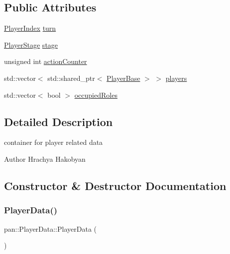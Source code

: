 \subsection*{Public Attributes}
\begin{DoxyCompactItemize}
\item 
\hyperlink{namespacepan_a0cdabf874fbf1bb3a1f0152d108c2909}{Player\+Index} \hyperlink{structpan_1_1_player_data_a5e25e3064088436cb55df4d1fe256cb0}{turn}
\item 
\hyperlink{namespacepan_a5c203ea0600f2bca14baf8f38e5bac5d}{Player\+Stage} \hyperlink{structpan_1_1_player_data_a8f06369e6df4f62a3d5be54cace7aa17}{stage}
\item 
unsigned int \hyperlink{structpan_1_1_player_data_a088b5b37693cc53f7be4c3f2860c6648}{action\+Counter}
\item 
std\+::vector$<$ std\+::shared\+\_\+ptr$<$ \hyperlink{classpan_1_1_player_base}{Player\+Base} $>$ $>$ \hyperlink{structpan_1_1_player_data_a44a9f5f24c1020e2c186205e08c184c5}{players}
\item 
std\+::vector$<$ bool $>$ \hyperlink{structpan_1_1_player_data_aa79e564016ca865b17e4bf1b241fc827}{occupied\+Roles}
\end{DoxyCompactItemize}


\subsection{Detailed Description}
container for player related data 

\begin{DoxyAuthor}{Author}
Hrachya Hakobyan 
\end{DoxyAuthor}


\subsection{Constructor \& Destructor Documentation}
\mbox{\label{structpan_1_1_player_data_a7bd4ebf550c2dd24d62fe443a2494a7b}} 
\subsubsection{\texorpdfstring{Player\+Data()}{PlayerData()}\hspace{0.1cm}{\footnotesize\ttfamily [1/3]}}
{\footnotesize\ttfamily pan\+::\+Player\+Data\+::\+Player\+Data (\begin{DoxyParamCaption}{ }\end{DoxyParamCaption})}

